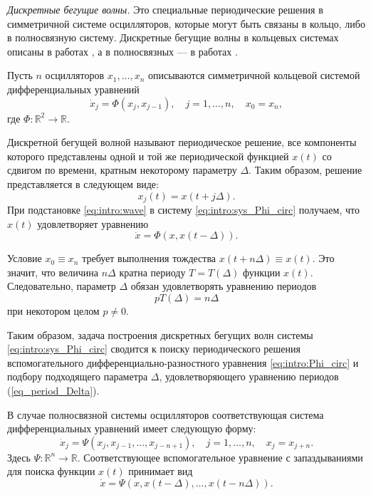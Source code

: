 \textit{Дискретные бегущие волны.} Это специальные периодические решения в симметричной системе осцилляторов, которые могут быть связаны в кольцо, либо в полносвязную систему. Дискретные бегущие волны в кольцевых системах описаны в работах \cite{GlyKol2013a, Glyzin2016, Kolesov2016}, а в полносвязных --- в работах \cite{Glyzin2022, Glyzin2022a, Preobrazhenskii2024}.

Пусть $n$ осцилляторов $x_1, \ldots, x_n$ описываются симметричной кольцевой системой дифференциальных уравнений
\begin{equation}
\label{eq:intro:sys_Phi_circ}
	\dot{x}_j=\Phi(x_j, x_{j-1}), \quad j=1, \ldots, n, \quad x_{0} = x_{n},
\end{equation}
где $\Phi:\mathbb{R}^2\to\mathbb{R}$. 

Дискретной бегущей волной называют периодическое решение, все компоненты которого представлены одной и той же периодической функцией $x(t)$ со сдвигом по времени, кратным некоторому параметру $\Delta$. Таким образом, решение представляется в следующем виде:
%
\begin{equation}
\label{eq:intro:wave}
	x_j(t) = x(t + j\Delta).
\end{equation}
%
При подстановке \eqref{eq:intro:wave} в систему \eqref{eq:intro:sys_Phi_circ} получаем, что $x(t)$ удовлетворяет уравнению
%
\begin{equation}
	\label{eq:intro:Phi_circ}
	\dot{x}=\Phi(x, x(t-\Delta)).
\end{equation}

Условие $x_0 \equiv x_n$ требует выполнения тождества
$x(t + n\Delta) \equiv x(t)$. Это значит, что величина $n\Delta$ кратна периоду $T = T(\Delta)$ функции $x(t)$. Следовательно, параметр $\Delta$ обязан удовлетворять уравнению периодов
\begin{equation}
	\label{eq_period_Delta}
	p T(\Delta) = n\Delta
\end{equation}
при некотором целом $p \neq 0$.

Таким образом, задача построения дискретных бегущих волн системы \eqref{eq:intro:sys_Phi_circ} сводится к поиску периодического решения вспомогательного дифференциально-разностного уравнения \eqref{eq:intro:Phi_circ} и подбору подходящего параметра $\Delta$, удовлетворяющего уравнению периодов (\ref{eq_period_Delta}). 

В случае полносвязной системы осцилляторов соответствующая система дифференциальных уравнений имеет следующую форму:
%
\begin{equation}\label{eq:intro:sys_Psi_full}
	\dot{x}_j= \Psi(x_j, x_{j-1}, \ldots, x_{j-n+1}), \quad j=1, \ldots, n, \quad x_j = x_{j+n}.
\end{equation}
%
Здесь $\Psi:\mathbb{R}^{n}\to\mathbb{R}$. 
Соответствующее вспомогательное уравнение с запаздываниями для поиска функции $x(t)$ принимает вид
%
\begin{equation}
	\label{eq:intro:Psi_full}
	\dot{x}= \Psi(x, x(t-\Delta), \ldots, x(t-n\Delta)).
\end{equation}

